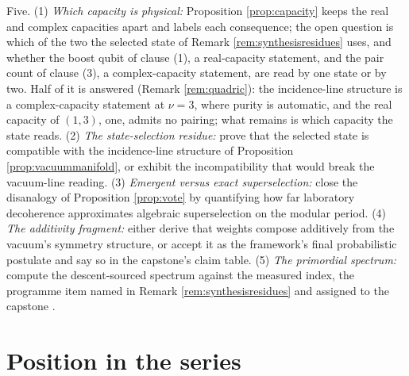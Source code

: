 \documentclass[11pt]{article}
\theoremstyle{definition}
\begin{document}
Five. (1) \emph{Which capacity is physical:} Proposition \ref{prop:capacity} keeps the real and complex capacities apart and labels each consequence; the open question is which of the two the selected state of Remark \ref{rem:synthesisresidues} uses, and whether the boost qubit of clause (1), a real-capacity statement, and the pair count of clause (3), a complex-capacity statement, are read by one state or by two. Half of it is answered (Remark \ref{rem:quadric}): the incidence-line structure is a complex-capacity statement at $\nu = 3$, where purity is automatic, and the real capacity of $(1,3)$, one, admits no pairing; what remains is which capacity the state reads. (2) \emph{The state-selection residue:} prove that the selected state is compatible with the incidence-line structure of Proposition \ref{prop:vacuummanifold}, or exhibit the incompatibility that would break the vacuum-line reading. (3) \emph{Emergent versus exact superselection:} close the disanalogy of Proposition \ref{prop:vote} by quantifying how far laboratory decoherence approximates algebraic superselection on the modular period. (4) \emph{The additivity fragment:} either derive that weights compose additively from the vacuum's symmetry structure, or accept it as the framework's final probabilistic postulate and say so in the capstone's claim table. (5) \emph{The primordial spectrum:} compute the descent-sourced spectrum against the measured index, the programme item named in Remark \ref{rem:synthesisresidues} and assigned to the capstone \cite{ButlerT17}.

\section{Position in the series}\label{sec:position}
\end{document}
